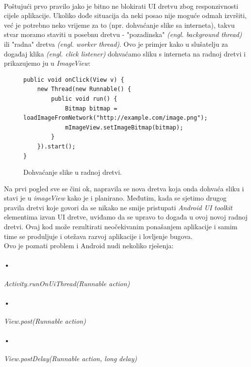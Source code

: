 \documentclass[times, utf8, zavrsni]{fer}
\begin{document}
\paragraph{}
Poštujući prvo pravilo jako je bitno ne blokirati UI dretvu zbog responzivnosti cijele aplikacije. Ukoliko dođe situacija da neki posao nije moguće odmah izvršiti, već je potrebno neko vrijeme za to (npr. dohvaćanje slike sa interneta), takvu stvar moramo staviti u posebnu dretvu - "pozadinska" \textit{(engl. background thread)}  ili "radna" dretva \textit{(engl. worker thread)}.\newpage
Ovo je primjer kako u slušatelju za događaj klika \textit{(engl. click listener)} dohvaćamo sliku s interneta na radnoj dretvi i prikazujemo ju u \textit{ImageView}:

\begin{figure}[ht!]
\begin{lstlisting}
public void onClick(View v) {
    new Thread(new Runnable() {
        public void run() {
            Bitmap bitmap = loadImageFromNetwork("http://example.com/image.png");
            mImageView.setImageBitmap(bitmap);
        }
    }).start();
}
\end{lstlisting}
\caption{Dohvaćanje slike u radnoj dretvi.}
\label{overflow}
\end{figure}

Na prvi pogled sve se čini ok, napravila se nova dretva koja onda dohvaća sliku i stavi je u \textit{imageView} kako je i planirano. Međutim, kada se sjetimo drugog pravila dretvi koje govori da se nikako ne smije pristupati \textit{Android UI toolkit} elementima izvan UI dretve, uviđamo da se upravo to događa u ovoj novoj radnoj dretvi. Ovaj kod može rezultirati neočekivanim ponašanjem aplikacije i samim time se produljuje i otežava razvoj aplikacije i lovljenje bugova.\\

Ovo je poznati problem i Android nudi nekoliko rješenja:
\paragraph{•}
\textit{Activity.runOnUiThread(Runnable action)}
\paragraph{•}
\textit{View.post(Runnable action)}
\paragraph{•}
\textit{View.postDelay(Runnable action, long delay)
}\\
\end{document}
